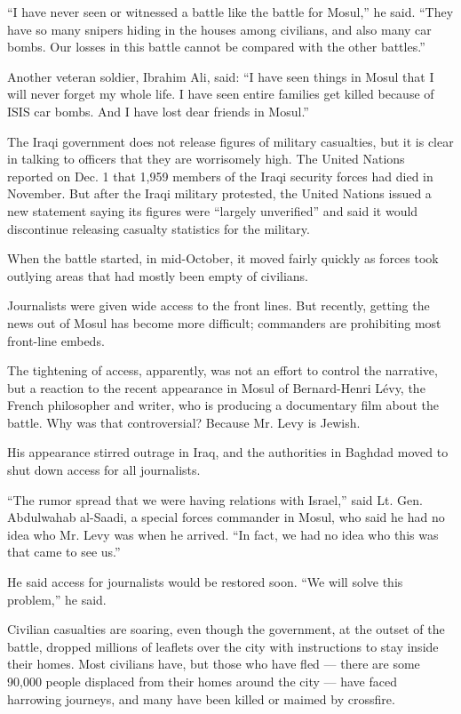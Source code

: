 ``I have never seen or witnessed a battle like the battle for Mosul,''
he said. ``They have so many snipers hiding in the houses among
civilians, and also many car bombs. Our losses in this battle cannot be
compared with the other battles.''

Another veteran soldier, Ibrahim Ali, said: ``I have seen things in
Mosul that I will never forget my whole life. I have seen entire
families get killed because of ISIS car bombs. And I have lost dear
friends in Mosul.''

The Iraqi government does not release figures of military casualties,
but it is clear in talking to officers that they are worrisomely high.
The United Nations reported on Dec. 1 that 1,959 members of the Iraqi
security forces had died in November. But after the Iraqi military
protested, the United Nations issued a new statement saying its figures
were ``largely unverified'' and said it would discontinue releasing
casualty statistics for the military.

When the battle started, in mid-October, it moved fairly quickly as
forces took outlying areas that had mostly been empty of civilians.

Journalists were given wide access to the front lines. But recently,
getting the news out of Mosul has become more difficult; commanders are
prohibiting most front-line embeds.

The tightening of access, apparently, was not an effort to control the
narrative, but a reaction to the recent appearance in Mosul of
Bernard-Henri Lévy, the French philosopher and writer, who is producing
a documentary film about the battle. Why was that controversial? Because
Mr. Levy is Jewish.

His appearance stirred outrage in Iraq, and the authorities in Baghdad
moved to shut down access for all journalists.

``The rumor spread that we were having relations with Israel,'' said Lt.
Gen. Abdulwahab al-Saadi, a special forces commander in Mosul, who said
he had no idea who Mr. Levy was when he arrived. ``In fact, we had no
idea who this was that came to see us.''

He said access for journalists would be restored soon. ``We will solve
this problem,'' he said.

Civilian casualties are soaring, even though the government, at the
outset of the battle, dropped millions of leaflets over the city with
instructions to stay inside their homes. Most civilians have, but those
who have fled --- there are some 90,000 people displaced from their
homes around the city --- have faced harrowing journeys, and many have
been killed or maimed by crossfire.

